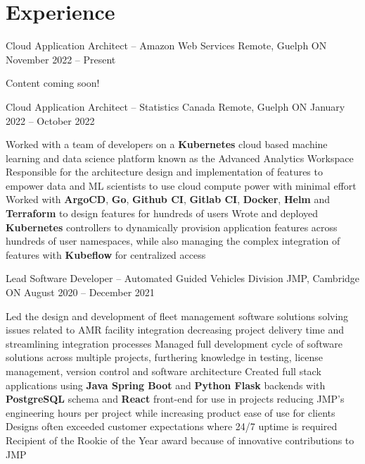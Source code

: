 \documentclass[a4paper,11pt]{article}
\begin{document}
\sectionsep
\section{Experience}
\begin{subheading}

	\resumeExp
	{Cloud Application Architect -- Amazon Web Services}
	{Remote, Guelph ON}
	{November 2022 -- Present}
	{}
	\begin{entries}
		\ib Content coming soon!
	\end{entries}

	\resumeExp
	{Cloud Application Architect -- Statistics Canada}
	{Remote, Guelph ON}
	{January 2022 -- October 2022}
	{}
	\begin{entries}
		\ib Worked with a team of developers on a \textbf{Kubernetes} cloud based machine learning and data science
		platform known as the Advanced Analytics Workspace
		\href{https://analytics-platform.statcan.gc.ca/covid19}{\footnotesize{\faExternalLink}}
		\ib Responsible for the architecture design and implementation of features to  empower data and ML scientists to
		use cloud compute power with  minimal effort
		\ib Worked with \textbf{ArgoCD}, \textbf{Go}, \textbf{Github CI}, \textbf{Gitlab CI}, \textbf{Docker}, \textbf{Helm} and
		\textbf{Terraform} to design features for hundreds of users
		\ib Wrote and deployed \textbf{Kubernetes} controllers to dynamically provision application
		features across hundreds of user namespaces, while
		also managing the complex integration of features with \textbf{Kubeflow} for centralized access
	\end{entries}

	\resumeExp
	{Lead Software Developer -- Automated Guided Vehicles Division}
	{JMP, Cambridge ON}
	{August 2020 -- December 2021}
	{}
	\begin{entries}
		\ib Led the design and development of fleet management software solutions solving issues related to
		AMR facility integration decreasing project delivery time and streamlining integration processes
		\ib  Managed full development cycle of software solutions across multiple projects, furthering
		knowledge in testing, license management, version control and software architecture
		\ib Created full stack applications using \textbf{Java Spring Boot} and \textbf{Python Flask} backends with
		\textbf{PostgreSQL} schema and \textbf{React} front-end for use in projects reducing JMP's engineering hours
		per project while increasing product ease of use for clients
		\ib Designs often exceeded customer expectations where 24/7 uptime is required
		\ib Recipient of the Rookie of the Year award because of innovative contributions to JMP
	\end{entries}


\end{subheading}
\end{document}
